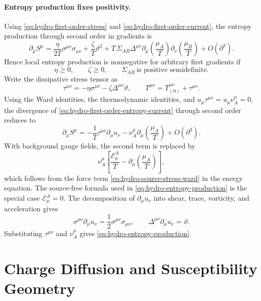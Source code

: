 \paragraph{Entropy production fixes positivity.}
Using \eqref{eq:hydro-first-order-stress} and
\eqref{eq:hydro-first-order-current}, the entropy production through second
order in gradients is
\begin{equation}
  \partial_\mu S^\mu
  =
  \frac{\eta}{2T}\sigma^{\mu\nu}\sigma_{\mu\nu}
  +\frac{\zeta}{T}\vartheta^2
  +T\,\Sigma_{AB}
  \Delta^{\mu\nu}
  \partial_\mu\!\left(\frac{\mu_A}{T}\right)
  \partial_\nu\!\left(\frac{\mu_B}{T}\right)
  +O(\partial^3).
  \label{eq:hydro-entropy-production}
\end{equation}
Hence local entropy production is nonnegative for arbitrary first gradients
if
\[
  \eta\ge0,\qquad \zeta\ge0,\qquad
  \Sigma_{AB}\ \text{is positive semidefinite}.
\]
Write the dissipative stress tensor as
\[
  \tau^{\mu\nu}
  =
  -\eta\sigma^{\mu\nu}-\zeta\Delta^{\mu\nu}\vartheta,
  \qquad
  T^{\mu\nu}=T_{(0)}^{\mu\nu}+\tau^{\mu\nu}.
\]
Using the Ward identities, the thermodynamic identities, and
\(u_\mu\tau^{\mu\nu}=u_\mu\nu_A^\mu=0\), the divergence of
\eqref{eq:hydro-first-order-entropy-current} through second order reduces to
\[
  \partial_\mu S^\mu
  =
  -\frac{1}{T}\tau^{\mu\nu}\partial_\mu u_\nu
  -\nu_A^\mu\partial_\mu\!\left(\frac{\mu_A}{T}\right)
  +O(\partial^3).
\]
With background gauge fields, the second term is replaced by
\[
  \nu_A^\mu
  \left[
    \frac{\mathcal E^A_\mu}{T}
    -\partial_\mu\!\left(\frac{\mu_A}{T}\right)
  \right],
\]
which follows from the force term
\eqref{eq:hydro-source-stress-ward} in the energy equation.  The
source-free formula used in \eqref{eq:hydro-entropy-production} is the
special case \(\mathcal E^A_\mu=0\).
The decomposition of \(\partial_\mu u_\nu\) into shear, trace, vorticity,
and acceleration gives
\[
  \sigma^{\mu\nu}\partial_\mu u_\nu
  =
  \frac12\sigma^{\mu\nu}\sigma_{\mu\nu},
  \qquad
  \Delta^{\mu\nu}\partial_\mu u_\nu=\vartheta.
\]
Substituting \(\tau^{\mu\nu}\) and \(\nu_A^\mu\) gives
\eqref{eq:hydro-entropy-production}.

\section{Charge Diffusion and Susceptibility Geometry}


